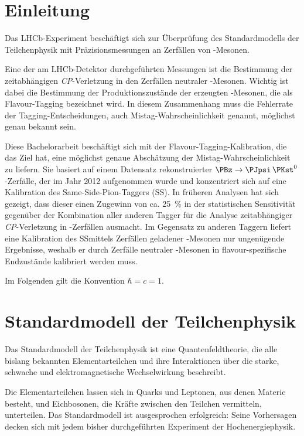 \newcommand{\difference}[1]{\mathrm{\Delta} #1}

\section{Einleitung}

Das LHCb-Experiment beschäftigt sich zur Überprüfung des Standardmodells der Teilchenphysik mit Präzisionsmessungen an Zerfällen von \PB-Mesonen.

Eine der am LHCb-Detektor durchgeführten Messungen ist die Bestimmung der zeitabhängigen \textit{CP}-Verletzung in den Zerfällen neutraler \PB-Mesonen.
Wichtig ist dabei die Bestimmung der Produktionszustände der erzeugten \PB-Mesonen, die als Flavour-Tagging bezeichnet wird.
In diesem Zusammenhang muss die Fehlerrate der Tagging-Entscheidungen, auch Mistag-Wahrscheinlichkeit genannt, möglichst genau bekannt sein.

Diese Bachelorarbeit beschäftigt sich mit der Flavour-Tagging-Kalibration, die das Ziel hat, eine möglichst genaue Abschätzung der Mistag-Wahrscheinlichkeit zu liefern.
Sie basiert auf einem Datensatz rekonstruierter $\PBz \to \PJpsi\,\PKst^0$-Zerfälle, der im Jahr 2012 aufgenommen wurde und konzentriert sich auf eine Kalibration des Same-Side-Pion-Taggers (SS\Pgp).
In früheren Analysen \cite{sin2beta} hat sich gezeigt, dass dieser einen Zugewinn von ca. \SI{25}{\percent} in der statistischen Sensitivität gegenüber der Kombination aller anderen Tagger für die Analyse zeitabhängiger \textit{CP}-Verletzung in \PBz-Zerfällen ausmacht.
Im Gegensatz zu anderen Taggern liefert eine Kalibration des SS\Pgp mittels Zerfällen geladener \PB-Mesonen nur ungenügende Ergebnisse, weshalb er durch Zerfälle neutraler \PB-Mesonen in flavour-spezifische Endzustände kalibriert werden muss.

Im Folgenden gilt die Konvention $\hbar = c = 1$.

\newpage

\section{Standardmodell der Teilchenphysik}
\label{standard-model}

Das Standardmodell der Teilchenphysik ist eine Quantenfeldtheorie, die alle bislang bekannten Elementarteilchen und ihre Interaktionen über die starke, schwache und elektromagnetische Wechselwirkung beschreibt.

Die Elementarteilchen lassen sich in Quarks und Leptonen, aus denen Materie besteht, und Eichbosonen, die Kräfte zwischen den Teilchen vermitteln, unterteilen.
Das Standardmodell ist ausgesprochen erfolgreich: Seine Vorhersagen decken sich mit jedem bisher durchgeführten Experiment der Hochenergiephysik.

